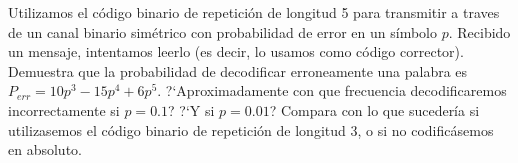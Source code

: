 \begin{problem}[10]  Utilizamos el código binario de repetición de longitud 5
para transmitir a traves de un canal binario simétrico con
probabilidad de error en un símbolo $p$. Recibido un mensaje,
 intentamos leerlo (es decir, lo usamos como
código corrector). Demuestra que la probabilidad de decodificar
erroneamente una palabra es $P_{err}=10p^3-15p^4+6p^5$.
?`Aproximadamente con que frecuencia decodificaremos
incorrectamente si $p=0.1$? ?`Y si  $p=0.01$? Compara con lo que
sucedería si utilizasemos el código binario de repetición de
longitud 3, o si no codificásemos en absoluto.
\solution
\end{problem}

